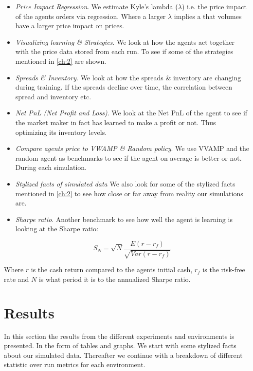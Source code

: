 \documentclass{kththesis}
\theoremstyle{definition}
\begin{document}
\begin{itemize}
\item \textit{Price Impact Regression}. We estimate Kyle's lambda ($\lambda$) i.e. the price impact of the agents orders via regression. Where a larger $\lambda$ implies a that volumes have a larger price impact on prices.

\item \textit{Visualizing learning \& Strategies}. We look at how the agents act together with the price data stored from each run. To see if some of the strategies mentioned in \autoref{ch:2} are shown. 
    
\item \textit{Spreads \& Inventory}. We look at how the spreads \& inventory are changing during training. If the spreads decline over time, the correlation between spread and inventory etc.

\item \textit{Net PnL (Net Profit and Loss)}. We look at the Net PnL of the agent to see if the market maker in fact has learned to make a profit or not. Thus optimizing its inventory levels. 

\item \textit{Compare agents price to VWAMP \& Random policy}. We use VVAMP and the random agent as benchmarks to see if the agent on average is better or not. During each simulation.

\item \textit{Stylized facts of simulated data}
We also look for some of the stylized facts mentioned in \autoref{ch:2} to see how close or far away from reality our simulations are.

\item \textit{Sharpe ratio}. Another benchmark to see how well the agent is learning is looking at the Sharpe ratio:

\begin{equation}
    \label{eq:s}
    S_N = \sqrt{N} \frac{E(r-r_{f})}{\sqrt{Var(r-r_{f})}}
\end{equation}
\end{itemize}
Where $r$ is the cash return compared to the agents initial cash, $r_f$ is the risk-free rate and  $N$ is what period it is to the annualized Sharpe ratio.

\chapter{Results}\label{ch:6}
In this section the results from the different experiments and environments is presented. In the form of tables and graphs. We start with some stylized facts about our simulated data. Thereafter we continue with a breakdown of different statistic over run metrics for each environment.   
\end{document}
